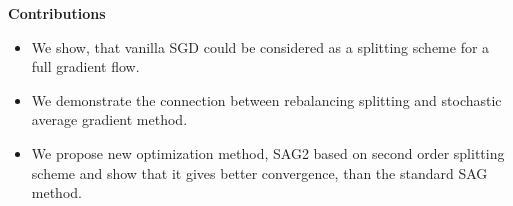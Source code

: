 \documentclass{article} %
\begin{document}







\textbf{Contributions}
\begin{itemize}
    \item We show, that vanilla SGD could be considered as a splitting scheme for a full gradient flow.
    \item We demonstrate the connection between rebalancing splitting and stochastic average gradient method.
    \item We propose new optimization method, SAG2 based on second order splitting scheme and show that it gives better convergence, than the standard SAG method.
\end{itemize}
\end{document}
